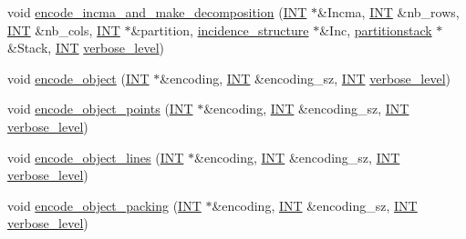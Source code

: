 \begin{DoxyCompactItemize}
\item 
void \mbox{\hyperlink{classobject__in__projective__space_a8f0ebd9ca15ecfeb61480cb884888444}{encode\+\_\+incma\+\_\+and\+\_\+make\+\_\+decomposition}} (\mbox{\hyperlink{galois_8h_a09fddde158a3a20bd2dcadb609de11dc}{I\+NT}} $\ast$\&Incma, \mbox{\hyperlink{galois_8h_a09fddde158a3a20bd2dcadb609de11dc}{I\+NT}} \&nb\+\_\+rows, \mbox{\hyperlink{galois_8h_a09fddde158a3a20bd2dcadb609de11dc}{I\+NT}} \&nb\+\_\+cols, \mbox{\hyperlink{galois_8h_a09fddde158a3a20bd2dcadb609de11dc}{I\+NT}} $\ast$\&partition, \mbox{\hyperlink{classincidence__structure}{incidence\+\_\+structure}} $\ast$\&Inc, \mbox{\hyperlink{classpartitionstack}{partitionstack}} $\ast$\&Stack, \mbox{\hyperlink{galois_8h_a09fddde158a3a20bd2dcadb609de11dc}{I\+NT}} \mbox{\hyperlink{simeon_8_c_a818073fbcc2f439e7c56952f67386122}{verbose\+\_\+level}})
\item 
void \mbox{\hyperlink{classobject__in__projective__space_a94a707237ade58291c1fc48f883c4930}{encode\+\_\+object}} (\mbox{\hyperlink{galois_8h_a09fddde158a3a20bd2dcadb609de11dc}{I\+NT}} $\ast$\&encoding, \mbox{\hyperlink{galois_8h_a09fddde158a3a20bd2dcadb609de11dc}{I\+NT}} \&encoding\+\_\+sz, \mbox{\hyperlink{galois_8h_a09fddde158a3a20bd2dcadb609de11dc}{I\+NT}} \mbox{\hyperlink{simeon_8_c_a818073fbcc2f439e7c56952f67386122}{verbose\+\_\+level}})
\item 
void \mbox{\hyperlink{classobject__in__projective__space_a46edc8e2e918819dd5fc880eb52177b8}{encode\+\_\+object\+\_\+points}} (\mbox{\hyperlink{galois_8h_a09fddde158a3a20bd2dcadb609de11dc}{I\+NT}} $\ast$\&encoding, \mbox{\hyperlink{galois_8h_a09fddde158a3a20bd2dcadb609de11dc}{I\+NT}} \&encoding\+\_\+sz, \mbox{\hyperlink{galois_8h_a09fddde158a3a20bd2dcadb609de11dc}{I\+NT}} \mbox{\hyperlink{simeon_8_c_a818073fbcc2f439e7c56952f67386122}{verbose\+\_\+level}})
\item 
void \mbox{\hyperlink{classobject__in__projective__space_a8fef74d42e906760c9c4a90254e75e3d}{encode\+\_\+object\+\_\+lines}} (\mbox{\hyperlink{galois_8h_a09fddde158a3a20bd2dcadb609de11dc}{I\+NT}} $\ast$\&encoding, \mbox{\hyperlink{galois_8h_a09fddde158a3a20bd2dcadb609de11dc}{I\+NT}} \&encoding\+\_\+sz, \mbox{\hyperlink{galois_8h_a09fddde158a3a20bd2dcadb609de11dc}{I\+NT}} \mbox{\hyperlink{simeon_8_c_a818073fbcc2f439e7c56952f67386122}{verbose\+\_\+level}})
\item 
void \mbox{\hyperlink{classobject__in__projective__space_af83064813b2e471be045e74620c134df}{encode\+\_\+object\+\_\+packing}} (\mbox{\hyperlink{galois_8h_a09fddde158a3a20bd2dcadb609de11dc}{I\+NT}} $\ast$\&encoding, \mbox{\hyperlink{galois_8h_a09fddde158a3a20bd2dcadb609de11dc}{I\+NT}} \&encoding\+\_\+sz, \mbox{\hyperlink{galois_8h_a09fddde158a3a20bd2dcadb609de11dc}{I\+NT}} \mbox{\hyperlink{simeon_8_c_a818073fbcc2f439e7c56952f67386122}{verbose\+\_\+level}})
\end{DoxyCompactItemize}
